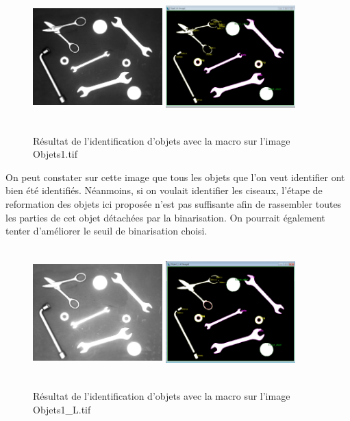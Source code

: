 \documentclass{scrreprt}
\begin{document}
\begin{figure}[!h]
\centering
\includegraphics[width=5cm, height=5cm]{images/objet1o.png}\hfill
\includegraphics[width=5cm, height=5cm]{images/objet1.png}
\caption{Résultat de l'identification d'objets avec la macro sur l'image Objets1.tif}
\end{figure}

On peut constater sur cette image que tous les objets que l'on veut identifier ont bien 
été identifiés. Néanmoins, si on voulait identifier les ciseaux, l'étape de reformation 
des objets ici proposée n'est pas suffisante afin de rassembler toutes les parties de cet
objet détachées par la binarisation. On pourrait également tenter d'améliorer le seuil 
de binarisation choisi.  

\begin{figure}[!h]
\centering
\includegraphics[width=5cm, height=5cm]{images/objet1Lo.png}\hfill
\includegraphics[width=5cm, height=5cm]{images/objet1L.png}
\caption{Résultat de l'identification d'objets avec la macro sur l'image Objets1_L.tif}
\end{figure}
\end{document}
